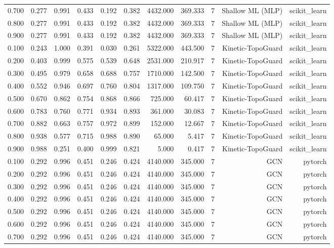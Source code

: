 \begin{tabular}{lrrrrrrrrrr}
0.700 & 0.277 & 0.991 & 0.433 & 0.192 & 0.382 & 4432.000 & 369.333 & 7 & Shallow ML (MLP) & scikit\_learn \\
0.800 & 0.277 & 0.991 & 0.433 & 0.192 & 0.382 & 4432.000 & 369.333 & 7 & Shallow ML (MLP) & scikit\_learn \\
0.900 & 0.277 & 0.991 & 0.433 & 0.192 & 0.382 & 4432.000 & 369.333 & 7 & Shallow ML (MLP) & scikit\_learn \\
0.100 & 0.243 & 1.000 & 0.391 & 0.030 & 0.261 & 5322.000 & 443.500 & 7 & Kinetic-TopoGuard & scikit\_learn \\
0.200 & 0.403 & 0.999 & 0.575 & 0.539 & 0.648 & 2531.000 & 210.917 & 7 & Kinetic-TopoGuard & scikit\_learn \\
0.300 & 0.495 & 0.979 & 0.658 & 0.688 & 0.757 & 1710.000 & 142.500 & 7 & Kinetic-TopoGuard & scikit\_learn \\
0.400 & 0.552 & 0.946 & 0.697 & 0.760 & 0.804 & 1317.000 & 109.750 & 7 & Kinetic-TopoGuard & scikit\_learn \\
0.500 & 0.670 & 0.862 & 0.754 & 0.868 & 0.866 & 725.000 & 60.417 & 7 & Kinetic-TopoGuard & scikit\_learn \\
0.600 & 0.783 & 0.760 & 0.771 & 0.934 & 0.893 & 361.000 & 30.083 & 7 & Kinetic-TopoGuard & scikit\_learn \\
0.700 & 0.882 & 0.663 & 0.757 & 0.972 & 0.899 & 152.000 & 12.667 & 7 & Kinetic-TopoGuard & scikit\_learn \\
0.800 & 0.938 & 0.577 & 0.715 & 0.988 & 0.890 & 65.000 & 5.417 & 7 & Kinetic-TopoGuard & scikit\_learn \\
0.900 & 0.988 & 0.251 & 0.400 & 0.999 & 0.821 & 5.000 & 0.417 & 7 & Kinetic-TopoGuard & scikit\_learn \\
0.100 & 0.292 & 0.996 & 0.451 & 0.246 & 0.424 & 4140.000 & 345.000 & 7 & GCN & pytorch \\
0.200 & 0.292 & 0.996 & 0.451 & 0.246 & 0.424 & 4140.000 & 345.000 & 7 & GCN & pytorch \\
0.300 & 0.292 & 0.996 & 0.451 & 0.246 & 0.424 & 4140.000 & 345.000 & 7 & GCN & pytorch \\
0.400 & 0.292 & 0.996 & 0.451 & 0.246 & 0.424 & 4140.000 & 345.000 & 7 & GCN & pytorch \\
0.500 & 0.292 & 0.996 & 0.451 & 0.246 & 0.424 & 4140.000 & 345.000 & 7 & GCN & pytorch \\
0.600 & 0.292 & 0.996 & 0.451 & 0.246 & 0.424 & 4140.000 & 345.000 & 7 & GCN & pytorch \\
0.700 & 0.292 & 0.996 & 0.451 & 0.246 & 0.424 & 4140.000 & 345.000 & 7 & GCN & pytorch \\

\end{tabular}
